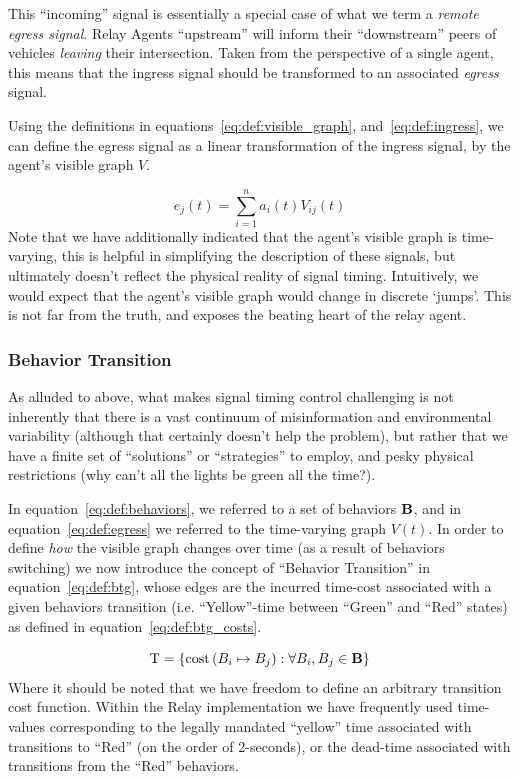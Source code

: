 \documentclass{report}
\newcommand{\Tau}{\mathrm{T}}
\begin{document}
This ``incoming'' signal is essentially a special case of what we term a \emph{remote egress signal}.
Relay Agents ``upstream'' will inform their ``downstream'' peers of vehicles \emph{leaving} their intersection.
Taken from the perspective of a single agent, this means that the ingress signal should be transformed to an associated \emph{egress} signal.

Using the definitions in equations~\eqref{eq:def:visible_graph}, and~\eqref{eq:def:ingress}, we can define the egress signal as a linear transformation of the ingress signal, by the agent's visible graph $V$.

\begin{equation}\label{eq:def:egress}
	e_j(t) = \sum_{i=1}^n a_i(t) V_{ij}(t)
\end{equation}
Note that we have additionally indicated that the agent's visible graph is time-varying, this is helpful in simplifying the description of these signals, but ultimately doesn't reflect the physical reality of signal timing.
Intuitively, we would expect that the agent's visible graph would change in discrete `jumps'.
This is not far from the truth, and exposes the beating heart of the relay agent.


\subsubsection{Behavior Transition}
\label{sec:btg}

As alluded to above, what makes signal timing control challenging is not inherently that there is a vast continuum of misinformation and environmental variability (although that certainly doesn't help the problem), but rather that we have a finite set of ``solutions'' or ``strategies'' to employ, and pesky physical restrictions (why can't all the lights be green all the time?).

In equation~\eqref{eq:def:behaviors}, we referred to a set of behaviors $\bf{B}$, and in equation~\eqref{eq:def:egress} we referred to the time-varying graph $V(t)$.
In order to define \emph{how} the visible graph changes over time (as a result of behaviors switching) we now introduce the concept of ``Behavior Transition'' in equation~\eqref{eq:def:btg}, whose edges are the incurred time-cost associated with a given behaviors transition (i.e. ``Yellow''-time between ``Green'' and ``Red'' states) as defined in equation~\eqref{eq:def:btg_costs}.

\begin{equation}\label{eq:def:btg_costs}
	\Tau = \{\mbox{cost}\left(B_i \mapsto B_j \right) : \forall B_i, B_j \in \bf{B} \}
\end{equation}
Where it should be noted that we have freedom to define an arbitrary transition cost function.
Within the Relay implementation we have frequently used time-values corresponding to the legally mandated ``yellow'' time associated with transitions to ``Red'' (on the order of 2-seconds), or the dead-time associated with transitions from the ``Red'' behaviors.
\end{document}
